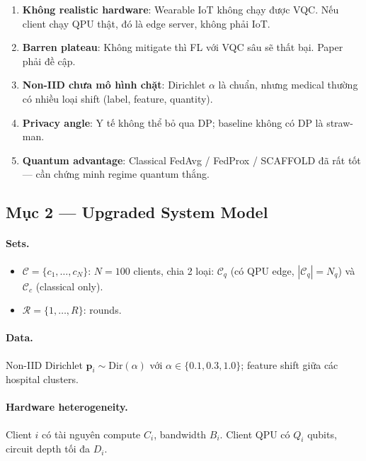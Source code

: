 \documentclass[11pt,a4paper]{article}
\begin{document}
\begin{critique}
\begin{enumerate}
  \item \textbf{Không realistic hardware}: Wearable IoT không chạy được VQC. Nếu client chạy QPU thật, đó là edge server, không phải IoT.
  \item \textbf{Barren plateau}: Không mitigate thì FL với VQC sâu sẽ thất bại. Paper phải đề cập.
  \item \textbf{Non-IID chưa mô hình chặt}: Dirichlet $\alpha$ là chuẩn, nhưng medical thường có nhiều loại shift (label, feature, quantity).
  \item \textbf{Privacy angle}: Y tế không thể bỏ qua DP; baseline không có DP là straw-man.
  \item \textbf{Quantum advantage}: Classical FedAvg / FedProx / SCAFFOLD đã rất tốt --- cần chứng minh regime quantum thắng.
\end{enumerate}
\end{critique}

\subsection{Mục 2 --- Upgraded System Model}

\paragraph{Sets.}
\begin{itemize}
  \item $\mathcal{C} = \{c_1, \dots, c_N\}$: $N = 100$ clients, chia 2 loại: $\mathcal{C}_q$ (có QPU edge, $|\mathcal{C}_q| = N_q$) và $\mathcal{C}_c$ (classical only).
  \item $\mathcal{R} = \{1, \dots, R\}$: rounds.
\end{itemize}

\paragraph{Data.}
Non-IID Dirichlet $\mathbf{p}_i \sim \mathrm{Dir}(\alpha)$ với $\alpha \in \{0.1, 0.3, 1.0\}$; feature shift giữa các hospital clusters.

\paragraph{Hardware heterogeneity.}
Client $i$ có tài nguyên compute $C_i$, bandwidth $B_i$. Client QPU có $Q_i$ qubits, circuit depth tối đa $D_i$.
\end{document}
